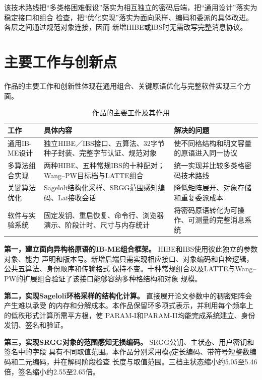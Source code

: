 该技术路线把“多类格困难假设”落实为相互独立的密码后端，把“通用设计”落实为稳定接口和组合
检查，把“优化实现”落实为面向采样、编码和委派的具体改进。各层之间通过规范对象连接，因而
新增HIBE或IBS时无需改写完整消息协议。

\section{主要工作与创新点}

作品的主要工作和创新性体现在通用组合、关键原语优化与完整软件实现三个方面。

\begin{table}[H]
\centering\small
\caption{作品的主要工作及其作用}
\label{tab:main-contributions}
\begin{tabularx}{\textwidth}{@{}p{}p{}X@{}}
\toprule
\rowcolor{black!8} 工作 & 具体内容 & 解决的问题 \\
\midrule
通用IB-ME设计 & 独立HIBE／IBS接口、五算法、32字节种子封装、完整字节认证、规范对象 & 使不同格结构和明文容量的原语进入同一协议 \\
多算法组合实现 & 两种HIBE、五种常规IBS的十种配对；Wang--PW目标档与LATTE组合 & 统一实现并比较多类格密码技术路线 \\
关键算法优化 & Sageloli结构化采样、SRGG范围感知编码、Lai接收会话 & 降低矩阵展开、对象存储和重复委派成本 \\
软件与实验系统 & 固定发钥、重启恢复、命令行、浏览器演示、阶段计时、尺寸与内存统计 & 将密码原语转化为可操作、可测量的完整消息系统 \\
\bottomrule
\end{tabularx}
\end{table}

\textbf{第一，建立面向异构格原语的IB-ME组合框架。} HIBE和IBS使用彼此独立的参数对象、能力
声明和版本号。新增后端只需实现相应接口、对象编码和自检逻辑，公共五算法、身份顺序和传输格式
保持不变。十种常规组合以及LATTE与Wang--PW的扩展组合验证了该接口能够容纳多种格结构和对象
规模。

\textbf{第二，实现Sageloli环格采样的结构化计算。} 直接展开论文参数中的稠密矩阵会产生难以承受
的内存和分解成本。本作品保留环多项式表示，并利用每个频率上的低秩形式计算所需平方根，使
PARAM-I和PARAM-II均能完成系统建立、身份发钥、签名和验证。

\textbf{第三，实现SRGG对象的范围感知无损编码。} SRGG公钥、主状态、用户密钥和签名中的字段
具有不同取值范围。本作品分别采用模$q$定长编码、带符号短整数编码和二元编码，并在解码阶段检查
长度与取值范围。三档主状态缩小约5.05至5.46倍，签名缩小约2.55至2.65倍。

